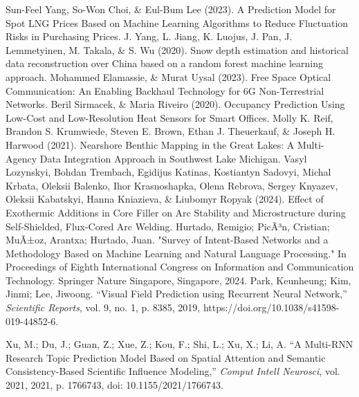 \documentclass[runningheads]{llncs}
\begin{document}
\begin{thebibliography}{00}
     Sun-Feel Yang, So-Won Choi, \& Eul-Bum Lee (2023). A Prediction Model for Spot LNG Prices Based on Machine Learning Algorithms to Reduce Fluctuation Risks in Purchasing Prices.
 J. Yang, L. Jiang, K. Luojus, J. Pan, J. Lemmetyinen, M. Takala, \& S. Wu (2020). Snow depth estimation and historical data reconstruction over China based on a random forest machine learning approach.
 Mohammed Elamassie, \& Murat Uysal (2023). Free Space Optical Communication: An Enabling Backhaul Technology for 6G Non-Terrestrial Networks.
 Beril Sirmacek, \& Maria Riveiro (2020). Occupancy Prediction Using Low-Cost and Low-Resolution Heat Sensors for Smart Offices.
 Molly K. Reif, Brandon S. Krumwiede, Steven E. Brown, Ethan J. Theuerkauf, \& Joseph H. Harwood (2021). Nearshore Benthic Mapping in the Great Lakes: A Multi-Agency Data Integration Approach in Southwest Lake Michigan.
 Vasyl Lozynskyi, Bohdan Trembach, Egidijus Katinas, Kostiantyn Sadovyi, Michal Krbata, Oleksii Balenko, Ihor Krasnoshapka, Olena Rebrova, Sergey Knyazev, Oleksii Kabatskyi, Hanna Kniazieva, \& Liubomyr Ropyak (2024). Effect of Exothermic Additions in Core Filler on Arc Stability and Microstructure during Self-Shielded, Flux-Cored Arc Welding.
    Hurtado, Remigio; PicÃ³n, Cristian; MuÃ±oz, Arantxa; Hurtado, Juan.
    "Survey of Intent-Based Networks and a Methodology Based on Machine Learning and Natural Language Processing."
    In Proceedings of Eighth International Congress on Information and Communication Technology.
    Springer Nature Singapore, Singapore, 2024.
    Park, Keunheung; Kim, Jinmi; Lee, Jiwoong. 
    ``Visual Field Prediction using Recurrent Neural Network,'' 
    \emph{Scientific Reports}, 
    vol. 9, no. 1, p. 8385, 
    2019, 
    https://doi.org/10.1038/s41598-019-44852-6.
    
    Xu, M.; Du, J.; Guan, Z.; Xue, Z.; Kou, F.; Shi, L.; Xu, X.; Li, A. 
    ``A Multi-RNN Research Topic Prediction Model Based on Spatial Attention and Semantic Consistency-Based Scientific Influence Modeling,'' 
    \emph{Comput Intell Neurosci}, 
    vol. 2021, 
    2021, 
    p. 1766743, 
    doi: 10.1155/2021/1766743.
    

\end{thebibliography}
\end{document}
